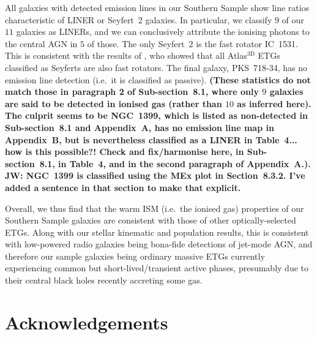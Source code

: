 \documentclass[a4paper,fleqn,usenatbib]{mnras}
\begin{document}
All galaxies with detected emission lines in our Southern Sample show
line ratios characteristic of LINER or Seyfert~2 galaxies. In
particular, we classify $9$ of our $11$ galaxies as LINERs, and we can
conclusively attribute the ionising photons to the central AGN in $5$
of those. The only Seyfert~2 is the fast rotator IC~1531. This is
consistent with the results of \citet{Nyland2016}, who showed that all
Atlas$^\text{3D}$ ETGs classified as Seyferts are also fast rotators.
The final galaxy, PKS~718-34, has no emission line detection (i.e.\ it
is classified as passive). {\bf (These statistics do not match those
  in paragraph 2 of Sub-section~8.1, where only $9$ galaxies are said
  to be detected in ionised gas (rather than $10$ as inferred
  here). The culprit seems to be NGC~1399, which is listed as
  non-detected in Sub-section~8.1 and Appendix~A, has no emission line
  map in Appendix~B, but is nevertheless classified as a LINER in
  Table~4... how is this possible?! Check and fix/harmonise here, in
  Sub-section~8.1, in Table~4, and in the second paragraph of
  Appendix~A.). JW: NGC~1399 is classified using the MEx plot in 
  Section~8.3.2. I've added a sentence in that section to make that
  explicit.}

Overall, we thus find that the warm ISM (i.e.\ the ionised gas)
properties of our Southern Sample galaxies are consistent with those
of other optically-selected ETGs. Along with our stellar kinematic and
population results, this is consistent with low-powered radio galaxies
being bona-fide detections of jet-mode AGN, and therefore our sample
galaxies being ordinary massive ETGs currently experiencing common but
short-lived/transient active phases, presumably due to their central
black holes recently accreting some gas.

\section*{Acknowledgements}
\end{document}
